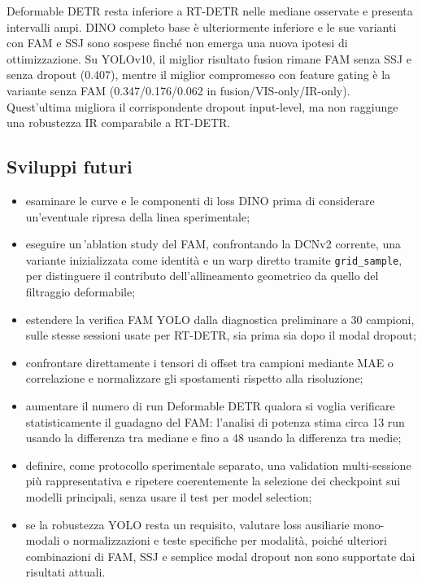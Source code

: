 \documentclass[a4paper,11pt]{article}
\begin{document}
Deformable DETR resta inferiore a RT-DETR nelle mediane osservate e presenta intervalli ampi. DINO completo base è ulteriormente inferiore e le sue varianti con FAM e SSJ sono sospese finché non emerga una nuova ipotesi di ottimizzazione. Su YOLOv10, il miglior risultato fusion rimane FAM senza SSJ e senza dropout (0.407), mentre il miglior compromesso con feature gating è la variante senza FAM (0.347/0.176/0.062 in fusion/VIS-only/IR-only). Quest'ultima migliora il corrispondente dropout input-level, ma non raggiunge una robustezza IR comparabile a RT-DETR.


\subsection{Sviluppi futuri}

\begin{itemize}
    \item esaminare le curve e le componenti di loss DINO prima di considerare un'eventuale ripresa della linea sperimentale;
    \item eseguire un\,'ablation study del FAM, confrontando la DCNv2 corrente, una variante inizializzata come identità e un warp diretto tramite \texttt{grid\_sample}, per distinguere il contributo dell'allineamento geometrico da quello del filtraggio deformabile;
    \item estendere la verifica FAM YOLO dalla diagnostica preliminare a 30 campioni, sulle stesse sessioni usate per RT-DETR, sia prima sia dopo il modal dropout;
    \item confrontare direttamente i tensori di offset tra campioni mediante MAE o correlazione e normalizzare gli spostamenti rispetto alla risoluzione;
    \item aumentare il numero di run Deformable DETR qualora si voglia verificare statisticamente il guadagno del FAM: l'analisi di potenza stima circa 13 run usando la differenza tra mediane e fino a 48 usando la differenza tra medie;
    \item definire, come protocollo sperimentale separato, una validation multi-sessione più rappresentativa e ripetere coerentemente la selezione dei checkpoint sui modelli principali, senza usare il test per model selection;
    \item se la robustezza YOLO resta un requisito, valutare loss ausiliarie mono-modali o normalizzazioni e teste specifiche per modalità, poiché ulteriori combinazioni di FAM, SSJ e semplice modal dropout non sono supportate dai risultati attuali.
\end{itemize}
\end{document}
